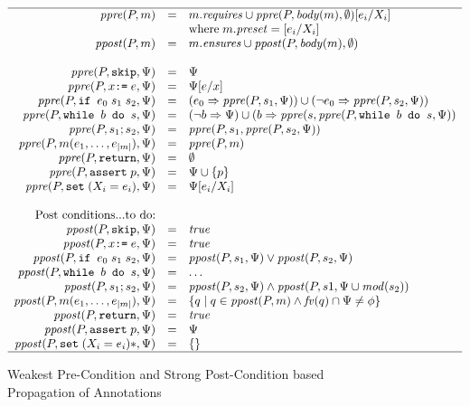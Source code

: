 \documentclass[10pt,notitlepage,twoside]{article}
\newcommand{\ppre}{\mathit{ppre}}
\newcommand{\ppost}{\mathit{ppost}}
\newcommand{\mod}{\mathit{mod}}
\newcommand{\fv}{\mathit{fv}}
\newcommand{\true}{\mathit{true}}
\begin{document}
\begin{figure}[tbp]
\begin{displaymath}
\begin{array}{rcl}
\hline 
\ppre(P,m) & = & m.\mathit{requires} \cup \ppre(P,\mathit{body}(m),\emptyset)[e_i/X_i]  \\
& & \mbox{where}\; m.\mathit{preset} = [e_i/X_i] \\
\ppost(P,m) & = & m.\mathit{ensures} \cup \ppost(P,\mathit{body}(m),\emptyset) \\
\ \\
\ppre(P,\texttt{skip},\Psi) & = & \Psi  \\
\ppre(P,x \texttt{:=}\; e,\Psi) & = & \Psi[e/x] \\
\ppre(P,\texttt{if }e_0\;s_1\;s_2,\Psi) & = & (e_0 \Rightarrow \ppre(P,s_1,\Psi)) \cup (\neg e_0 \Rightarrow \ppre(P,s_2,\Psi)) \\
\ppre(P,\texttt{while }b\texttt{ do }s,\Psi) & = & (\neg b \Rightarrow \Psi) \cup (b \Rightarrow \ppre(s,\ppre(P,\texttt{while }b\texttt{ do }s,\Psi))   \\
\ppre(P,s_1; s_2,\Psi) & = & \ppre(P,s_1,\ppre(P,s_2,\Psi))  \\
\ppre(P,m(e_1,\ldots,e_{|m|}),\Psi) & = & \ppre(P,m)  \\
\ppre(P,\texttt{return},\Psi) & = & \emptyset  \\
\ppre(P,\texttt{assert}\;p,\Psi) & = & \Psi \cup \{ p \} \\
\ppre(P,\texttt{set}\;(X_i = e_i),\Psi) & = & \Psi[e_i/X_i] \\
\ \\
\mbox{Post conditions...to do:}\\
\ppost(P,\texttt{skip},\Psi) & = & \true  \\
\ppost(P,x \texttt{:=}\; e,\Psi) & = & \true \\
\ppost(P,\texttt{if }e_0\;s_1\;s_2,\Psi) & = & \ppost(P,s_1,\Psi) \vee \ppost(P,s_2,\Psi) \\
\ppost(P,\texttt{while }b\texttt{ do }s,\Psi) & = & \ldots    \\
\ppost(P,s_1; s_2,\Psi) & = & \ppost(P,s_2,\Psi) \wedge \ppost(P,s1,\Psi\cup\mod(s_2))  \\
\ppost(P,m(e_1,\ldots,e_{|m|}),\Psi) & = & \{ q \mid q \in \ppost(P,m) \wedge \fv(q) \cap \Psi \neq \phi   \}\\
\ppost(P,\texttt{return},\Psi) & = & \true \\
\ppost(P,\texttt{assert}\;p,\Psi) & = & \Psi \\
\ppost(P,\texttt{set}\;(X_i = e_i)*,\Psi) & = & \{ \}  \\
\hline
\end{array}
\end{displaymath}
\caption{Weakest Pre-Condition and Strong Post-Condition based Propagation of Annotations}\label{fig:wp-propagation}
\end{figure}
\end{document}
